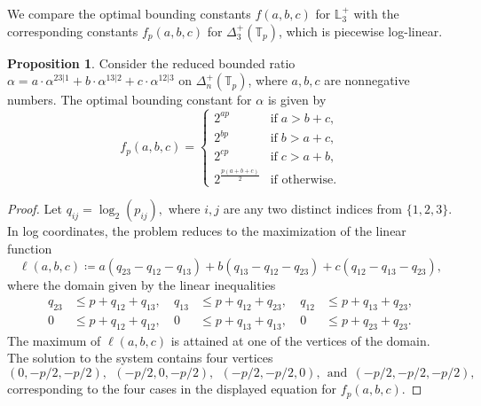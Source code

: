\documentclass{amsart}
\theoremstyle{definition}
\newtheorem{proposition}[theorem]{Proposition}
\theoremstyle{remark}
\def\T{\mathbb{T}}
\def\L{\mathbb{L}}
\def\BR{\mathrm{BR}}
\begin{document}
We compare the optimal bounding constants $f(a,b,c)$ for $\L_3^+$ with the corresponding constants $f_p(a,b,c)$ for $\Delta_3^+(\T_p)$, which is piecewise log-linear. 
\begin{proposition}
Consider the reduced bounded ratio 
$\alpha=a \cdot \alpha^{23|1}+b \cdot \alpha^{13|2}+c \cdot \alpha^{12|3}$ on $\Delta_n^+(\T_p)$, where $a,b,c$ are nonnegative numbers. 
The optimal bounding constant for $\alpha$ is given by
\[
f_p(a,b,c)=\begin{cases}
2^{ap} & \text{if} \; a>b+c,\\
2^{bp} & \text{if} \; b>a+c,\\
2^{cp} & \text{if} \; c>a+b,\\
2^{\frac{p(a+b+c)}{2}} & \text{if otherwise}.
\end{cases}
\]	    
\end{proposition}
\begin{proof}
Let $q_{ij}=\log_2(p_{ij}),$ where $i,j$ are any two distinct indices from $\{1,2,3\}$. In log coordinates, the problem reduces to the maximization of the linear function
\[
\ell(a,b,c)\coloneq a(q_{23}-q_{12}-q_{13})+b(q_{13}-q_{12}-q_{23})+c(q_{12}-q_{13}-q_{23}), 
\]
where the domain given by the linear inequalities 
\begin{align*}
q_{23} &\leq p + q_{12} + q_{13}, & \
q_{13} &\leq p + q_{12} + q_{23}, & \
q_{12} &\leq p + q_{13} + q_{23}, \\
0 &\leq p + q_{12}+q_{12}, & \
0 &\leq p + q_{13}+q_{13}, & \
0 &\leq p + q_{23}+q_{23}.
\end{align*}
The maximum of $\ell(a,b,c)$ is attained at one of the vertices of the domain. The solution to the system contains four vertices
\[
 (0,-p/2,-p/2), \ \ (-p/2,0,-p/2), \ \ (-p/2,-p/2,0), \ \ \text{and} \ \ (-p/2,-p/2,-p/2),
\]
corresponding to the four cases in the displayed equation for $f_p(a,b,c)$.
\end{proof}
\end{document}
